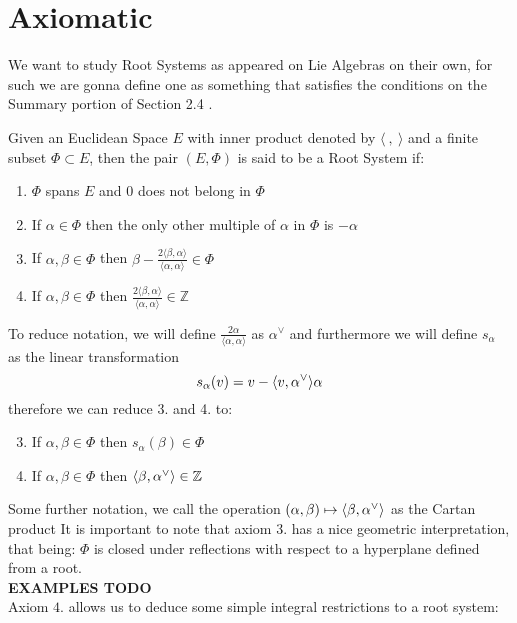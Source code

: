 \section{Axiomatic}
We want to study Root Systems as appeared on Lie Algebras on their own, for such we are gonna define one as something that satisfies the conditions on the Summary portion of Section 2.4 .\\
\begin{defi}
Given an Euclidean Space $E$ with inner product denoted by $\langle\ , \  \rangle$ and a finite subset $\Phi \subset E$, then the pair $(E,\Phi)$ is said to be a Root System if:
\begin{enumerate}
\item $\Phi$ spans $E$ and $0$ does not belong in $\Phi$
\item If $\alpha \in \Phi$ then the only other multiple of $\alpha$ in $\Phi$ is $-\alpha$
\item If $\alpha,\beta \in \Phi$ then $\beta-\frac{2\langle \beta,\alpha\rangle}{\langle \alpha,\alpha \rangle} \in \Phi$
\item If $\alpha,\beta \in \Phi$ then $\frac{2\langle \beta,\alpha\rangle}{\langle \alpha,\alpha \rangle} \in \mathbb{Z}$
\end{enumerate}
To reduce notation, we will define $\frac{2\alpha}{\langle \alpha,\alpha\rangle}$ as $\alpha^\lor$ and furthermore we will define $s_\alpha$ as the linear transformation 
$$s_\alpha(v) = v - \langle {v},{\alpha}^\lor\rangle\alpha$$ therefore we can reduce 3. and 4. to:
\begin{enumerate}[label=\arabic*b.]
	\setcounter{enumi}{2}
	\item If $\alpha,\beta \in \Phi$ then $s_\alpha(\beta)\in \Phi$
	\item If $\alpha,\beta \in \Phi$ then $\langle {\beta},{\alpha}^\lor\rangle \in \mathbb{Z}$
\end{enumerate}
\end{defi}
Some further notation, we call the operation $(\alpha,\beta)\mapsto \langle {\beta},{\alpha}^\lor\rangle$ as the Cartan product 
It is important to note that axiom $3.$ has a nice geometric interpretation, that being: $\Phi$ is closed under reflections with respect to a hyperplane defined from a root.\\
\textbf{EXAMPLES TODO}\\
Axiom $4.$ allows us to deduce some simple integral restrictions to a root system:
